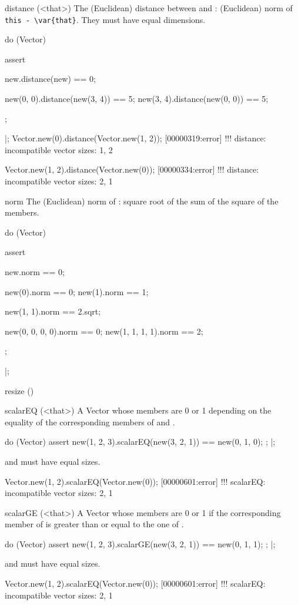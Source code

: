 \begin{urbiscriptapi}
\item[distance](<that>)%
  The (Euclidean) distance between \this and \that: (Euclidean) norm of
  \lstinline|this - \var{that}|.  They must have equal dimensions.
\begin{urbiscript}
do (Vector)
{
  assert
  {
    new.distance(new) == 0;

    new(0, 0).distance(new(3, 4)) == 5;
    new(3, 4).distance(new(0, 0)) == 5;
  };
}|;
Vector.new(0).distance(Vector.new(1, 2));
[00000319:error] !!! distance: incompatible vector sizes: 1, 2

Vector.new(1, 2).distance(Vector.new(0));
[00000334:error] !!! distance: incompatible vector sizes: 2, 1
\end{urbiscript}

\item[norm]%
  The (Euclidean) norm of \this: square root of the sum of the square of the
  members.
\begin{urbiscript}
do (Vector)
{
  assert
  {
    new.norm == 0;

    new(0).norm == 0;
    new(1).norm == 1;

    new(1, 1).norm == 2.sqrt;

    new(0, 0, 0, 0).norm == 0;
    new(1, 1, 1, 1).norm == 2;
  };
}|;
\end{urbiscript}


\item[resize]()%

\item[scalarEQ](<that>)%
  A Vector whose members are 0 or 1 depending on the equality of the
  corresponding members of \this and \that.
\begin{urbiscript}
do (Vector)
{
  assert
  {
    new(1, 2, 3).scalarEQ(new(3, 2, 1)) == new(0, 1, 0);
  };
}|;
\end{urbiscript}
  \this and \that must have equal sizes.
\begin{urbiscript}
Vector.new(1, 2).scalarEQ(Vector.new(0));
[00000601:error] !!! scalarEQ: incompatible vector sizes: 2, 1
\end{urbiscript}

\item[scalarGE](<that>)%
  A Vector whose members are 0 or 1 if the corresponding member of \this is
  greater than or equal to the one of \that.
\begin{urbiscript}
do (Vector)
{
  assert
  {
    new(1, 2, 3).scalarGE(new(3, 2, 1)) == new(0, 1, 1);
  };
}|;
\end{urbiscript}
  \this and \that must have equal sizes.
\begin{urbiscript}
Vector.new(1, 2).scalarEQ(Vector.new(0));
[00000601:error] !!! scalarEQ: incompatible vector sizes: 2, 1
\end{urbiscript}


\end{urbiscriptapi}
